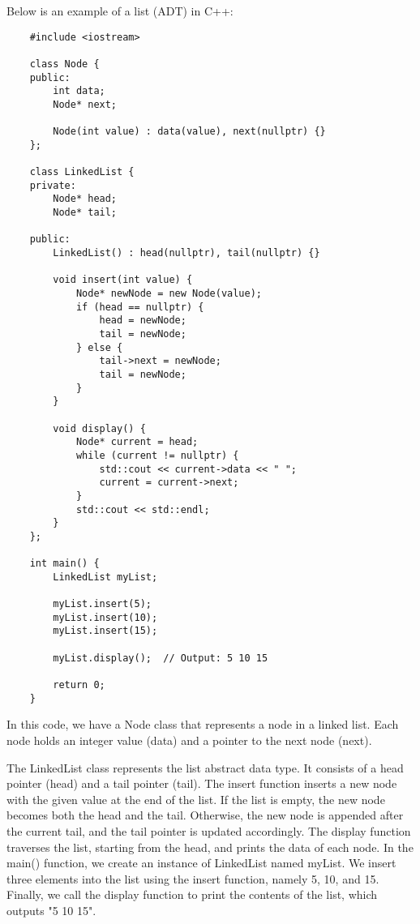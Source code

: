 \begin{solution}
    Below is an example of a list (ADT) in C++: 

    \horizontalline

    \begin{verbatim}
    #include <iostream>

    class Node {
    public:
        int data;
        Node* next;

        Node(int value) : data(value), next(nullptr) {}
    };

    class LinkedList {
    private:
        Node* head;
        Node* tail;

    public:
        LinkedList() : head(nullptr), tail(nullptr) {}

        void insert(int value) {
            Node* newNode = new Node(value);
            if (head == nullptr) {
                head = newNode;
                tail = newNode;
            } else {
                tail->next = newNode;
                tail = newNode;
            }
        }

        void display() {
            Node* current = head;
            while (current != nullptr) {
                std::cout << current->data << " ";
                current = current->next;
            }
            std::cout << std::endl;
        }
    };

    int main() {
        LinkedList myList;

        myList.insert(5);
        myList.insert(10);
        myList.insert(15);

        myList.display();  // Output: 5 10 15

        return 0;
    }
    \end{verbatim}

    \horizontalline

    In this code, we have a Node class that represents a node in a linked list. Each node holds an integer value (data) and a pointer to the next node (next).

    The LinkedList class represents the list abstract data type. It consists of a head pointer (head) and a tail pointer (tail). The insert function inserts a new node with the given value at the end of the list. If the list 
    is empty, the new node becomes both the head and the tail. Otherwise, the new node is appended after the current tail, and the tail pointer is updated accordingly. The display function traverses the list, starting from 
    the head, and prints the data of each node. In the main() function, we create an instance of LinkedList named myList. We insert three elements into the list using the insert function, namely 5, 10, and 15. Finally, we call the display function to print the contents 
    of the list, which outputs "5 10 15".


\end{solution}
